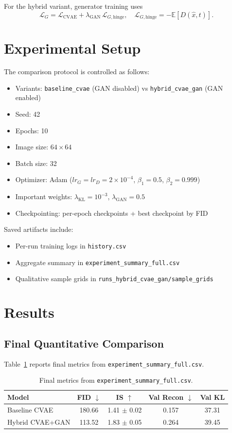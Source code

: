 \documentclass[11pt]{article}
\begin{document}
For the hybrid variant, generator training uses
\[
\mathcal{L}_G = \mathcal{L}_{\text{CVAE}} + \lambda_{\text{GAN}}\,\mathcal{L}_{G,\text{hinge}},
\quad
\mathcal{L}_{G,\text{hinge}} = -\mathbb{E}[D(\hat{x},t)].
\]

\section{Experimental Setup}

The comparison protocol is controlled as follows:
\begin{itemize}
\item Variants: \texttt{baseline\_cvae} (GAN disabled) vs \texttt{hybrid\_cvae\_gan} (GAN enabled)
\item Seed: 42
\item Epochs: 10
\item Image size: $64 \times 64$
\item Batch size: 32
\item Optimizer: Adam ($lr_G = lr_D = 2\times 10^{-4}$, $\beta_1=0.5$, $\beta_2=0.999$)
\item Important weights: $\lambda_{\text{KL}}=10^{-3}$, $\lambda_{\text{GAN}}=0.5$
\item Checkpointing: per-epoch checkpoints + best checkpoint by FID
\end{itemize}

Saved artifacts include:
\begin{itemize}
\item Per-run training logs in \texttt{history.csv}
\item Aggregate summary in \texttt{experiment\_summary\_full.csv}
\item Qualitative sample grids in \texttt{runs\_hybrid\_cvae\_gan/sample\_grids}
\end{itemize}

\section{Results}

\subsection{Final Quantitative Comparison}

Table~\ref{tab:main_results} reports final metrics from \texttt{experiment\_summary\_full.csv}.

\begin{table}[H]
\centering
\begin{tabular}{lcccc}
\toprule
Model & FID $\downarrow$ & IS $\uparrow$ & Val Recon $\downarrow$ & Val KL \\
\midrule
Baseline CVAE & 180.66 & 1.41 $\pm$ 0.02 & 0.157 & 37.31 \\
Hybrid CVAE+GAN & 113.52 & 1.83 $\pm$ 0.05 & 0.264 & 39.45 \\
\bottomrule
\end{tabular}
\caption{Final metrics from \texttt{experiment\_summary\_full.csv}.}
\label{tab:main_results}
\end{table}
\end{document}
